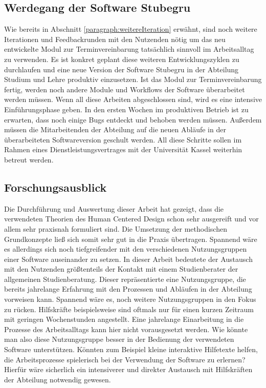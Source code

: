 \subsection*{Werdegang der Software Stubegru}
Wie bereits in Abschnitt \ref{paragraph:weitereIteration} erwähnt, sind noch
weitere Iterationen und Feedbackrunden mit den Nutzenden nötig um das neu
entwickelte Modul zur Terminvereinbarung tatsächlich sinnvoll im Arbeitsalltag
zu verwenden. Es ist konkret geplant diese weiteren Entwicklungszyklen zu
durchlaufen und eine neue Version der Software Stubegru in der Abteilung
Studium und Lehre produktiv einzusetzen. Ist das Modul zur Terminvereinbarung
fertig, werden noch andere Module und Workflows der Software überarbeitet
werden müssen. Wenn all diese Arbeiten abgeschlossen sind, wird es eine
intensive Einführungsphase geben. In den ersten Wochen im produktiven Betrieb
ist zu erwarten, dass noch einige Bugs entdeckt und behoben werden müssen.
Außerdem müssen die Mitarbeitenden der Abteilung auf die neuen Abläufe in der
überarbeiteten Softwareversion geschult werden. All diese Schritte sollen im
Rahmen eines Dienstleistungsvertrages mit der Universität Kassel weiterhin
betreut werden.

\subsection*{Forschungsausblick}
Die Durchführung und Auswertung dieser Arbeit hat gezeigt, dass die verwendeten
Theorien des Human Centered Design schon sehr ausgereift und vor allem sehr
praxisnah formuliert sind. Die Umsetzung der methodischen Grundkonzepte ließ
sich somit sehr gut in die Praxis übertragen. Spannend wäre es allerdings sich
noch tiefgreifender mit den verschiedenen Nutzungsgruppen einer Software
auseinander zu setzen. In dieser Arbeit bedeutete der Austausch mit den
Nutzenden größtenteils der Kontakt mit einem Studienberater der allgemeinen
Studienberatung. Dieser repräsentierte eine Nutzungsgruppe, die bereits
jahrelange Erfahrung mit den Prozessen und Abläufen in der Abteilung vorweisen
kann. Spannend wäre es, noch weitere Nutzungsgruppen in den Fokus zu rücken.
Hilfskräfte beispielsweise sind oftmals nur für einen kurzen Zeitraum mit
geringen Wochenstunden angestellt. Eine jahrelange Einarbeitung in die Prozesse
des Arbeitsalltags kann hier nicht vorausgesetzt werden. Wie könnte man also
diese Nutzungsgruppe besser in der Bedienung der verwendeten Software
unterstützen. Könnten zum Beispiel kleine interaktive Hilfetexte helfen, die
Arbeitsprozesse spielerisch bei der Verwendung der Software zu erlernen?
Hierfür wäre sicherlich ein intensiverer und direkter Austausch mit
Hilfskräften der Abteilung notwendig gewesen.

